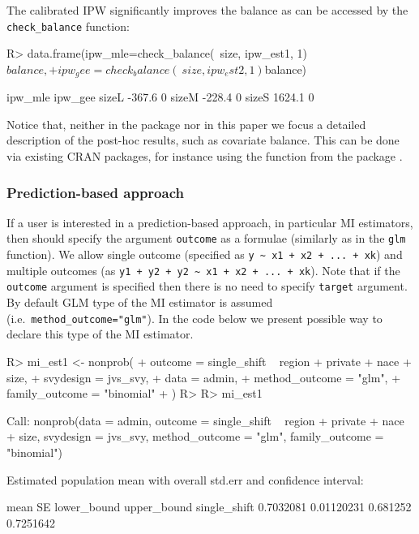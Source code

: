 \documentclass[
]{jss}
\begin{document}
The calibrated IPW significantly improves the balance as can be accessed
by the \texttt{check\_balance} function:

\begin{CodeChunk}
\begin{CodeInput}
R> data.frame(ipw_mle=check_balance(~size, ipw_est1, 1)$balance,
+            ipw_gee=check_balance(~size, ipw_est2, 1)$balance)
\end{CodeInput}
\begin{CodeOutput}
      ipw_mle ipw_gee
sizeL  -367.6       0
sizeM  -228.4       0
sizeS  1624.1       0
\end{CodeOutput}
\end{CodeChunk}

Notice that, neither in the package nor in this paper we focus a
detailed description of the post-hoc results, such as covariate balance.
This can be done via existing CRAN packages, for instance using the
 function from the  package \citep{cobalt}.

\subsubsection{Prediction-based
approach}\label{prediction-based-approach}

If a user is interested in a prediction-based approach, in particular MI
estimators, then should specify the argument \texttt{outcome} as a
formulae (similarly as in the \texttt{glm} function). We allow single
outcome (specified as
\texttt{y\ \textasciitilde{}\ x1\ +\ x2\ +\ ...\ +\ xk}) and multiple
outcomes (as
\texttt{y1\ +\ y2\ +\ y2\ \textasciitilde{}\ x1\ +\ x2\ +\ ...\ +\ xk}).
Note that if the \texttt{outcome} argument is specified then there is no
need to specify \texttt{target} argument. By default GLM type of the MI
estimator is assumed (i.e.~\texttt{method\_outcome="glm"}). In the code
below we present possible way to declare this type of the MI estimator.

\begin{CodeChunk}
\begin{CodeInput}
R> mi_est1 <- nonprob(
+   outcome = single_shift ~ region + private + nace + size,
+   svydesign = jvs_svy,
+   data = admin,
+   method_outcome = "glm",
+   family_outcome = "binomial"
+ )
R> 
R> mi_est1
\end{CodeInput}
\begin{CodeOutput}

Call:
nonprob(data = admin, outcome = single_shift ~ region + private + 
    nace + size, svydesign = jvs_svy, method_outcome = "glm", 
    family_outcome = "binomial")

Estimated population mean with overall std.err and confidence interval:

                  mean         SE lower_bound upper_bound
single_shift 0.7032081 0.01120231    0.681252   0.7251642
\end{CodeOutput}
\end{CodeChunk}
\end{document}
